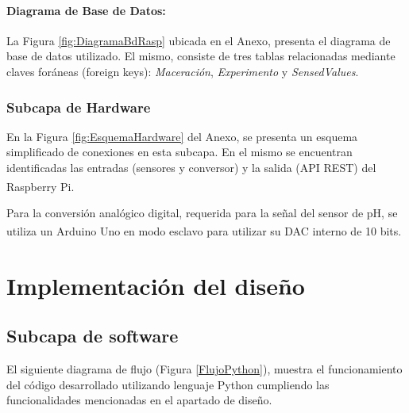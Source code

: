                 \paragraph{Diagrama de Base de Datos:} La Figura \ref{fig:DiagramaBdRasp} ubicada en el Anexo, presenta el diagrama de base de datos utilizado. El mismo, consiste de tres tablas relacionadas mediante claves foráneas (foreign keys): \textit{Maceración}, \textit{Experimento} y \textit{SensedValues}. 
                
                
            \subsubsection{Subcapa de Hardware} 
                \par En la Figura \ref{fig:EsquemaHardware} del Anexo, se presenta un esquema simplificado de conexiones en esta subcapa. En el mismo se encuentran identificadas las entradas (sensores y conversor) y la salida (API REST) del Raspberry\textsuperscript{\textregistered} Pi.
                
                
                
                \par Para la conversión analógico digital, requerida para la señal del sensor de pH, se utiliza un Arduino\textsuperscript{\textregistered} Uno en modo esclavo para utilizar su DAC interno de 10 bits.
        
    
\section{Implementación del diseño}

    \subsection{Subcapa de software}
        \par El siguiente diagrama de flujo (Figura \ref{FlujoPython}), muestra el funcionamiento del código desarrollado utilizando lenguaje Python cumpliendo las funcionalidades mencionadas en el apartado de diseño.

